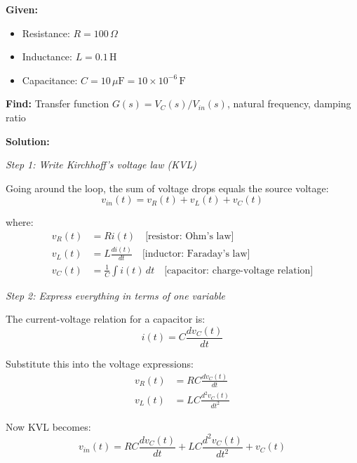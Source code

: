 \begin{example}
\begin{center}
\end{center}

\textbf{Given:}
\begin{itemize}
    \item Resistance: $R = 100\,\Omega$
    \item Inductance: $L = 0.1\,\text{H}$
    \item Capacitance: $C = 10\,\mu\text{F} = 10 \times 10^{-6}\,\text{F}$
\end{itemize}

\textbf{Find:} Transfer function $G(s) = V_C(s)/V_{in}(s)$, natural frequency, damping ratio

\textbf{Solution:}

\textit{Step 1: Write Kirchhoff's voltage law (KVL)}

Going around the loop, the sum of voltage drops equals the source voltage:
\begin{equation}
v_{in}(t) = v_R(t) + v_L(t) + v_C(t)
\end{equation}

where:
\begin{align}
v_R(t) &= R i(t) \quad \text{[resistor: Ohm's law]} \\
v_L(t) &= L \frac{di(t)}{dt} \quad \text{[inductor: Faraday's law]} \\
v_C(t) &= \frac{1}{C}\int i(t)\,dt \quad \text{[capacitor: charge-voltage relation]}
\end{align}

\textit{Step 2: Express everything in terms of one variable}

The current-voltage relation for a capacitor is:
\begin{equation}
i(t) = C \frac{dv_C(t)}{dt}
\end{equation}

Substitute this into the voltage expressions:
\begin{align}
v_R(t) &= RC \frac{dv_C(t)}{dt} \\
v_L(t) &= LC \frac{d^2v_C(t)}{dt^2}
\end{align}

Now KVL becomes:
\begin{equation}
v_{in}(t) = RC \frac{dv_C(t)}{dt} + LC \frac{d^2v_C(t)}{dt^2} + v_C(t)
\end{equation}


\end{example}
